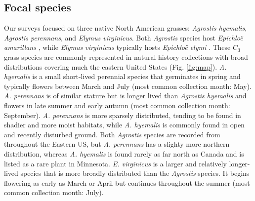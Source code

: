 \documentclass[11pt]{article}
\let\cite\citep
\begin{document}
        \subsection*{Focal species}
Our surveys focused on three native North American grasses: \emph{Agrostis hyemalis}, \emph{Agrostis perennans}, and \emph{Elymus virginicus}. 
Both \emph{Agrostis} species host \emph{Epichloë amarillans} \cite{craven2001multigene, leuchtmann2014nomenclatural}, while \emph{Elymus virginicus} typically hosts \emph{Epichloë elymi} \cite{clay2002evolutionary}.
These $C_3$ grass species are commonly represented in natural history collections with broad distributions covering much the eastern United States (Fig. \ref{fig:map}).
\emph{A. hyemalis} is a small short-lived perennial species that germinates in spring and typically flowers between March and July (most common collection month: May).
\emph{A. perennans} is of similar stature but is longer lived than \emph{Agrostis hyemalis} and flowers in late summer and early autumn (most common collection month: September). 
\emph{A. perennans} is more sparsely distributed, tending to be found in shadier and more moist habitats, while \emph{A. hyemalis} is commonly found in open and recently disturbed ground. 
Both \emph{Agrostis} species are recorded from throughout the Eastern US, but \emph{A. perennans} has a slighty more northern distribution, whereas \emph{A. hyemalis} is found rarely as far north as Canada and is listed as a rare plant in Minnesota.
\emph{E. virginicus} is a larger and relatively longer-lived  species that is more broadly distributed than the \emph{Agrostis} species. 
It begins flowering as early as March or April but continues throughout the summer (most common collection month: July).
\end{document}

